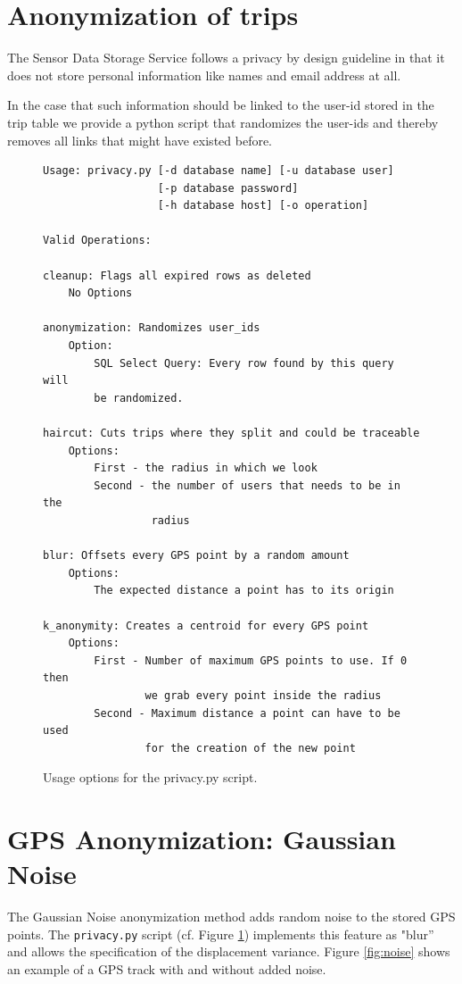\section{Anonymization of trips}
The Sensor Data Storage Service follows a privacy by design guideline
in that it does not store personal information like names and email
address at all.

In the case that such information should be linked to the user-id
stored in the trip table we provide a python script that randomizes
the user-ids and thereby removes all links that might have existed
before.

\begin{figure}[fontsize=\tiny]
\centering
\begin{verbatim}
Usage: privacy.py [-d database name] [-u database user]
                  [-p database password]
                  [-h database host] [-o operation]

Valid Operations:

cleanup: Flags all expired rows as deleted
    No Options

anonymization: Randomizes user_ids
    Option:
        SQL Select Query: Every row found by this query will
        be randomized.

haircut: Cuts trips where they split and could be traceable
    Options:
        First - the radius in which we look
        Second - the number of users that needs to be in the
                 radius

blur: Offsets every GPS point by a random amount
    Options:
        The expected distance a point has to its origin

k_anonymity: Creates a centroid for every GPS point
    Options:
        First - Number of maximum GPS points to use. If 0 then
                we grab every point inside the radius
        Second - Maximum distance a point can have to be used
                for the creation of the new point
\end{verbatim}
\caption{Usage options for the privacy.py script.}
\label{fig:privacypy}
\end{figure}

\section{GPS Anonymization: Gaussian Noise}

The Gaussian Noise anonymization method adds random noise to the
stored GPS points. The \texttt{privacy.py} script (cf. Figure
\ref{fig:privacypy}) implements this feature as "blur'' and allows the
specification of the displacement variance.  Figure \ref{fig:noise}
shows an example of a GPS track with and without added noise.

